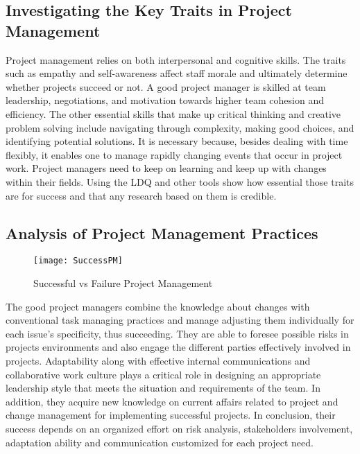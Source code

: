 \documentclass{article}
\begin{document}
\subsection{Investigating the Key Traits in Project Management}
Project management relies on both interpersonal and cognitive skills. The traits such as empathy and self-awareness affect staff morale and ultimately determine whether projects succeed or not. A good project manager is skilled at team leadership, negotiations, and motivation towards higher team cohesion and efficiency. The other essential skills that make up critical thinking and creative problem solving include navigating through complexity, making good choices, and identifying potential solutions. It is necessary because, besides dealing with time flexibly, it enables one to manage rapidly changing events that occur in project work. Project managers need to keep on learning and keep up with changes within their fields. Using the LDQ and other tools show how essential those traits are for success and that any research based on them is credible.\cite{muller2010leadership}

\subsection{Analysis of Project Management Practices}
\begin{figure}[htp]
    \centering
    \texttt{[image: SuccessPM]}
    \caption{Successful vs Failure Project Management}
    \label{fig:SuccessPM}
\end{figure}
The good project managers combine the knowledge about changes with conventional task managing practices and manage adjusting them individually for each issue’s specificity, thus succeeding. They are able to foresee possible risks in projects environments and also engage the different parties effectively involved in projects. Adaptability along with effective internal communications and collaborative work culture plays a critical role in designing an appropriate leadership style that meets the situation and requirements of the team. In addition, they acquire new knowledge on current affairs related to project and change management for implementing successful projects. In conclusion, their success depends on an organized effort on risk analysis, stakeholders involvement, adaptation ability and communication customized for each project need.\cite{pollack2016project}
\end{document}
